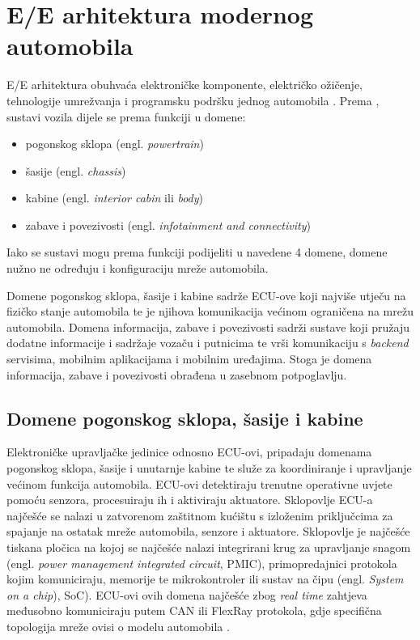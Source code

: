 \documentclass[times, utf8, diplomski, numeric]{fer}
\begin{document}
\section{E/E arhitektura modernog automobila}
E/E arhitektura obuhvaća elektroničke komponente, električko ožičenje, tehnologije umrežvanja i programsku podršku jednog automobila \cite{nasser2023automotive}. Prema \cite{nasser2023automotive, koscher2010, knight2020hacking, huq2020driving, aliwa2021cyberattacks}, sustavi vozila dijele se prema funkciji u domene:

\begin{itemize}
    \item pogonskog sklopa (engl. \textit{powertrain})
    \item šasije (engl. \textit{chassis})
    \item kabine (engl. \textit{interior cabin} ili \textit{body})
    \bigskip
    \item zabave i povezivosti (engl. \textit{infotainment and connectivity})
\end{itemize}

Iako se sustavi mogu prema funkciji podijeliti u navedene 4 domene, domene nužno ne određuju i konfiguraciju mreže automobila.

Domene pogonskog sklopa, šasije i kabine sadrže ECU-ove koji najviše utječu na fizičko stanje automobila te je njihova komunikacija većinom ograničena na mrežu automobila. Domena informacija, zabave i povezivosti sadrži sustave koji pružaju dodatne informacije i sadržaje vozaču i putnicima te vrši komunikaciju s \textit{backend} servisima, mobilnim aplikacijama i mobilnim uređajima. Stoga je domena informacija, zabave i povezivosti obrađena u zasebnom potpoglavlju.   
\subsection{Domene pogonskog sklopa, šasije i kabine}
Elektroničke upravljačke jedinice odnosno ECU-ovi, pripadaju domenama pogonskog sklopa, šasije i unutarnje kabine te služe za koordiniranje i upravljanje većinom funkcija automobila. ECU-ovi detektiraju trenutne operativne uvjete pomoću senzora, procesuiraju ih i aktiviraju aktuatore\cite{bosch2022handbook}. Sklopovlje ECU-a najčešće se nalazi u zatvorenom zaštitnom kućištu s izloženim priključcima za spajanje na ostatak mreže automobila, senzore i aktuatore. Sklopovlje je najčešće tiskana pločica na kojoj se najčešće nalazi integrirani krug za upravljanje snagom (engl. \textit{power management integrated circuit}, PMIC), primopredajnici protokola kojim komuniciraju, memorije te mikrokontroler ili sustav na čipu (engl. \textit{System on a chip}), SoC)\cite{nasser2023automotive}. ECU-ovi ovih domena najčešće zbog \textit{real time} zahtjeva međusobno komuniciraju putem CAN ili FlexRay protokola, gdje specifična topologija mreže ovisi o modelu automobila \cite{bosch2022handbook}.
\end{document}
